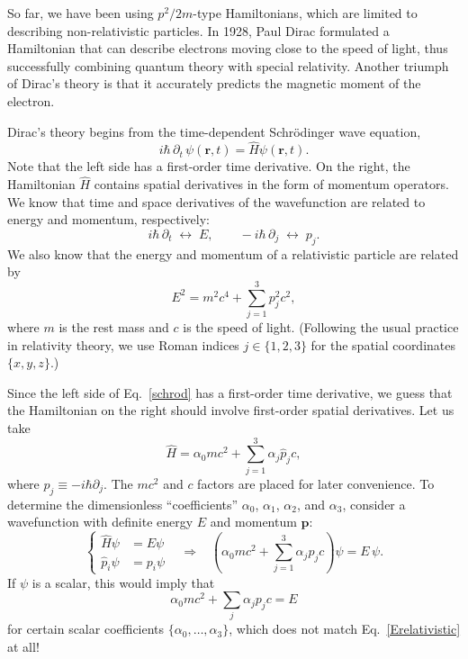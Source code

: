 \documentclass[prx,12pt]{revtex4-2}
\begin{document}
So far, we have been using $p^2/2m$-type Hamiltonians, which are
limited to describing non-relativistic particles.  In 1928, Paul Dirac
formulated a Hamiltonian that can describe electrons moving close to
the speed of light, thus successfully combining quantum theory with
special relativity. Another triumph of Dirac's theory is that it
accurately predicts the magnetic moment of the electron.

Dirac's theory begins from the time-dependent Schr\"odinger wave
equation,
\begin{equation}
  i\hbar\, \partial_t\, \psi(\mathbf{r},t)
  = \hat{H} \psi(\mathbf{r},t).
  \label{schrod}
\end{equation}
Note that the left side has a first-order time derivative.  On the
right, the Hamiltonian $\hat{H}$ contains spatial derivatives in the
form of momentum operators.  We know that time and space derivatives
of the wavefunction are related to energy and momentum, respectively:
\begin{equation}
    i\hbar\, \partial_t\; \leftrightarrow \;
    E, \qquad
    -i\hbar\, \partial_j \;\leftrightarrow \;
    p_j.
\end{equation}
We also know that the energy and momentum of a relativistic particle
are related by
\begin{equation}
  E^2 = m^2c^4 + \sum_{j=1}^3 p_j^2c^2,
  \label{Erelativistic}
\end{equation}
where $m$ is the rest mass and $c$ is the speed of light.  (Following
the usual practice in relativity theory, we use Roman indices $j \in
\{1,2,3\}$ for the spatial coordinates $\{x,y,z\}$.)

Since the left side of Eq.~\eqref{schrod} has a first-order time
derivative, we guess that the Hamiltonian on the right should involve
first-order spatial derivatives.  Let us take
\begin{equation}
  \hat{H} = \alpha_0 mc^2 + \sum_{j=1}^3 \alpha_j \hat{p}_j c,
  \label{Dirac0}
\end{equation}
where $\hat{p}_j \equiv -i\hbar \partial_j$.  The $mc^2$ and $c$
factors are placed for later convenience.  To determine the
dimensionless ``coefficients'' $\alpha_0$, $\alpha_1$, $\alpha_2$, and
$\alpha_3$, consider a wavefunction with definite energy $E$ and
momentum $\mathbf{p}$:
\begin{equation}
  \left\{\begin{aligned}\hat{H}\psi &= E \psi \\
  \hat{p}_i \psi &= p_i \psi
  \end{aligned}\right.
    \;\;\;\Rightarrow \;\;\;
  \left(\alpha_0mc^2 + \sum_{j=1}^3\alpha_j p_jc\right) \psi = E\,\psi.
\end{equation}
If $\psi$ is a scalar, this would imply that
\begin{equation*}
  \alpha_0 mc^2 + \sum_{j}\alpha_j p_j c = E
\end{equation*}
for certain scalar coefficients $\{\alpha_0, \dots, \alpha_3\}$, which
does not match Eq.~\eqref{Erelativistic} at all!
\end{document}
